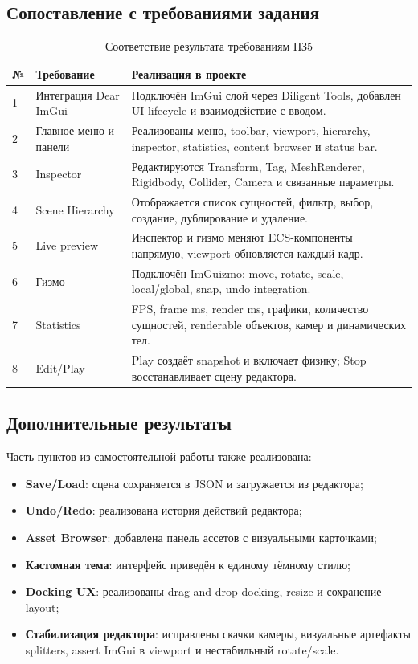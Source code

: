 \documentclass[a4paper,14pt]{extarticle}
\begin{document}
\subsection{Сопоставление с требованиями задания}
\begin{table}[H]
\centering
\small
\begin{tabular}{@{}p{7mm}p{73mm}p{73mm}@{}}
\toprule
№ & Требование & Реализация в проекте\\
\midrule
1 & Интеграция Dear ImGui & Подключён ImGui слой через Diligent Tools, добавлен UI lifecycle и взаимодействие с вводом.\\
2 & Главное меню и панели & Реализованы меню, toolbar, viewport, hierarchy, inspector, statistics, content browser и status bar.\\
3 & Inspector & Редактируются Transform, Tag, MeshRenderer, Rigidbody, Collider, Camera и связанные параметры.\\
4 & Scene Hierarchy & Отображается список сущностей, фильтр, выбор, создание, дублирование и удаление.\\
5 & Live preview & Инспектор и гизмо меняют ECS-компоненты напрямую, viewport обновляется каждый кадр.\\
6 & Гизмо & Подключён ImGuizmo: move, rotate, scale, local/global, snap, undo integration.\\
7 & Statistics & FPS, frame ms, render ms, графики, количество сущностей, renderable объектов, камер и динамических тел.\\
8 & Edit/Play & Play создаёт snapshot и включает физику; Stop восстанавливает сцену редактора.\\
\bottomrule
\end{tabular}
\caption{Соответствие результата требованиям ПЗ5}
\label{tab:pz5-requirements}
\end{table}

\subsection{Дополнительные результаты}
Часть пунктов из самостоятельной работы также реализована:
\begin{itemize}
  \item \textbf{Save/Load}: сцена сохраняется в JSON и загружается из редактора;
  \item \textbf{Undo/Redo}: реализована история действий редактора;
  \item \textbf{Asset Browser}: добавлена панель ассетов с визуальными карточками;
  \item \textbf{Кастомная тема}: интерфейс приведён к единому тёмному стилю;
  \item \textbf{Docking UX}: реализованы drag-and-drop docking, resize и сохранение layout;
  \item \textbf{Стабилизация редактора}: исправлены скачки камеры, визуальные артефакты splitters, assert ImGui в viewport и нестабильный rotate/scale.
\end{itemize}
\end{document}
